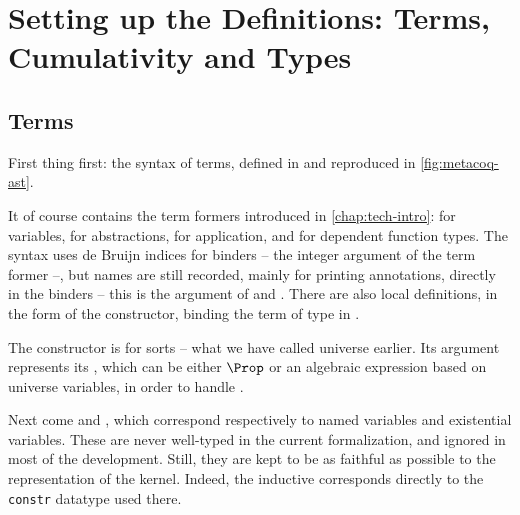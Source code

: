 \section[Terms, Cumulativity and Types]{Setting up the Definitions: Terms, Cumulativity and Types}
\label{sec:meta-defs}

\subsection{Terms}

First thing first: the syntax of terms, defined in  and reproduced in \cref{fig:metacoq-ast}.

\begin{figure*}
  \caption{The Abstract Syntax Tree of terms in  ()}
  \label{fig:metacoq-ast}
\end{figure*}

It of course contains  the term formers introduced in \cref{chap:tech-intro}:
 for variables,  for abstractions,
 for application, and  for dependent function types.
The syntax uses de Bruijn indices for binders – the integer argument of the 
term former –, but names are still recorded, mainly for printing annotations, directly in the
binders – this is the  argument of  and .
There are also local definitions, in the form of the  constructor,
binding the term  of type  in .

The  constructor is for sorts – what we have called universe earlier.
Its argument  represents its , which can be either $\Prop$
or an algebraic expression based on universe variables, in order to handle .

Next come  and , which
correspond respectively to named variables and existential variables. These are never well-typed in
the current formalization, and ignored in most of the development. Still, they are kept to be as
faithful as possible to the representation of the  kernel.
Indeed, the inductive  corresponds directly to the
\texttt{constr} datatype used there.%

